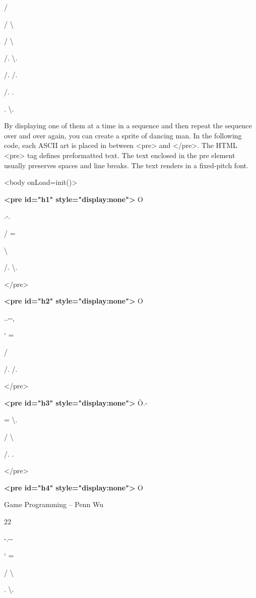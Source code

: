 \documentclass[
]{article}
\begin{document}
/ \textbar{}

/ \textbackslash{}

/ \textbackslash{}

/. \textbackslash.

/. /.

/. \textbar.

\textbar. \textbackslash.

By displaying one of them at a time in a sequence and then repeat the
sequence over and over again, you can create a sprite of dancing man. In
the following code, each ASCII art is placed in between
\textless pre\textgreater{} and \textless/pre\textgreater. The HTML
\textless pre\textgreater{} tag defines preformatted text. The text
enclosed in the pre element usually preserves spaces and line breaks.
The text renders in a fixed-pitch font.

\textless body onLoad=init()\textgreater{}

\textbf{\textless pre id="h1" style="display:none"\textgreater{}} O

.\textbar-.\textquotesingle{}

/ =

\textbar{} \textbackslash{}

/. \textbackslash.

\textless/pre\textgreater{}

\textbf{\textless pre id="h2" style="display:none"\textgreater{}} O

..\textbar-\/-,

` =

/ \textbar{}

/. /.

\textless/pre\textgreater{}

\textbf{\textless pre id="h3" style="display:none"\textgreater{}}
Ò.\textbar-

= \textbackslash.

/ \textbackslash{}

/. \textbar.

\textless/pre\textgreater{}

\textbf{\textless pre id="h4" style="display:none"\textgreater{}} O

Game Programming -- Penn Wu

22

\protect\hypertarget{index_split_003.htmlux5cux23p23}{}{}-.\textbar-\/-\textquotesingle{}

` =

/ \textbackslash{}

\textbar. \textbackslash.
\end{document}
